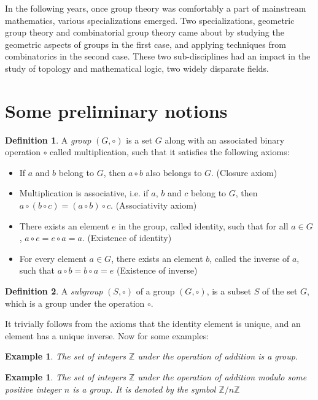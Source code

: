 \documentclass[12pt, titlepage]{article}
\newtheorem{exmp}[thm]{Example}
\theoremstyle{definition}
\newtheorem{defn}{Definition}[section]
\begin{document}
In the following years, once group theory was comfortably a part of mainstream mathematics, various specializations emerged. Two specializations, geometric group theory and combinatorial group theory came about by studying the geometric aspects of groups in the first case, and applying techniques from combinatorics in the second case. These two sub-disciplines had an impact in the study of topology and mathematical logic, two widely disparate fields.

\section{Some preliminary notions}

\begin{defn}
A \emph{group} $(G, \circ)$ is a set $G$ along with an associated binary operation $\circ$ called multiplication, such that it satisfies the following axioms:
\begin{itemize}
\item If $a$ and $b$ belong to $G$, then $a \circ b$ also belongs to $G$. (Closure axiom)
\item Multiplication is associative, i.e. if $a$, $b$ and $c$ belong to $G$, then $a \circ (b \circ c) = (a \circ b) \circ c$. (Associativity axiom)
\item There exists an element $e$ in the group, called identity, such that for all $a \in G$, $a \circ e = e \circ a = a$. (Existence of identity)
\item For every element $a \in G$, there exists an element $b$, called the inverse of $a$, such that $a \circ b = b \circ a = e$ (Existence of inverse)
\end{itemize}
\end{defn}

\begin{defn}
A \emph{subgroup} $(S, \circ)$ of a group $(G, \circ)$, is a subset $S$ of the set $G$, which is a group under the operation $\circ$.
\end{defn}

It trivially follows from the axioms that the identity element is unique, and an element has a unique inverse. Now for some examples:

\begin{exmp}
\label{int}
The set of integers $\mathbb{Z}$ under the operation of addition is a group.
\end{exmp}

\begin{exmp}
\label{int_mod}
The set of integers $\mathbb{Z}$ under the operation of addition modulo some positive integer $n$ is a group. It is denoted by the symbol $\mathbb{Z}/n\mathbb{Z}$
\end{exmp}
\end{document}
